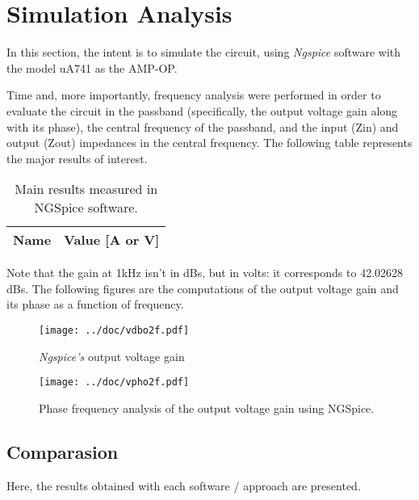 \section{Simulation Analysis}
\label{sec:simulation}

In this section, the intent is to simulate the circuit, using \textit{Ngspice} software with the model uA741 as the AMP-OP.

Time and, more importantly, frequency analysis were performed in order to evaluate the circuit in the passband (specifically, the output voltage gain along with its phase), the central frequency of the passband, and the input (Zin) and output (Zout) impedances in the central frequency. The following table represents the major results of interest.

\begin{table}[h]
    \centering
    \begin{tabular}{|l|r|}
      \hline    
      {\bf Name} & {\bf Value [A or V]} \\ \hline
      
      
      
    \end{tabular}
    \caption{Main results measured in NGSpice software.}
 \end{table}

Note that the gain at 1kHz isn't in dBs, but in volts: it corresponds to 42.02628 dBs.
The following figures are the computations of the output voltage gain and its phase as a function of frequency.

\begin{figure}[!htb]
    \centering
    \texttt{[image: ../doc/vdbo2f.pdf]}
    \caption{\textit{Ngspice's} output voltage gain}
\end{figure}

\begin{figure}[!htb]
    \centering
    \texttt{[image: ../doc/vpho2f.pdf]}
    \caption{Phase frequency analysis of the output voltage gain using NGSpice.}
\end{figure}



\clearpage

\subsection{Comparasion}
\label{sec:comparasion}

Here, the results obtained with each software / approach are presented.




